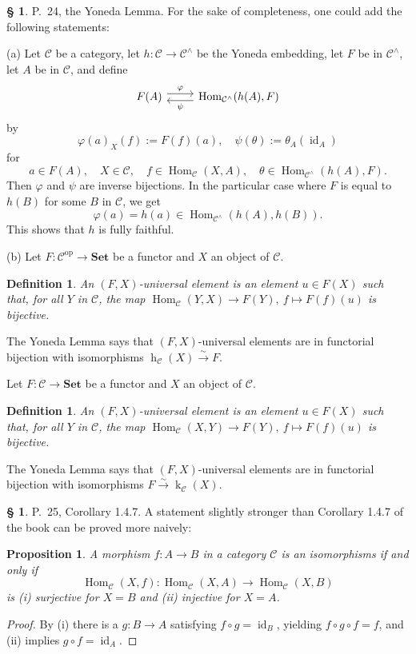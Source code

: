 \documentclass[12pt]{article}
\newtheorem{prop}[thm]{Proposition}
\newtheorem{df}[thm]{Definition}%
\theoremstyle{remark}
\theoremstyle{definition}
\newtheorem{s}[thm]{\S}
\newcommand{\C}{\mathcal C}
\newcommand{\Set}{\mathbf{Set}}
\newcommand{\xr}{\xrightarrow}
\DeclareMathOperator{\hy}{h}
\DeclareMathOperator{\ky}{k}
\DeclareMathOperator{\id}{id}
\DeclareMathOperator{\Hom}{Hom}%
\DeclareMathOperator{\op}{op}
\begin{document}
%
%
\begin{s} 
P.~24, the Yoneda Lemma. For the sake of completeness, one could add the following statements: 

\noindent(a) Let $\C$ be a category, let $h:\C\to\C^\wedge$ be the Yoneda embedding, let $F$ be in $\C^\wedge$, let $A$ be in $\C$, and define 
$$
\begin{tikzcd} 
F(A)\ar[yshift=0.7ex]{r}{\varphi}&\Hom_{\C^\wedge}(h(A),F)\ar[yshift=-0.7ex]{l}{\psi}
\end{tikzcd}
$$
by 
$$
\varphi(a)_X(f):=F(f)(a),\quad\psi(\theta):=\theta_A(\id_A)
$$
for 
$$
a\in F(A),\quad X\in\C,\quad f\in\Hom_\C(X,A),\quad\theta\in\Hom_{\C^\wedge}(h(A),F).
$$ 
Then $\varphi$ and $\psi$ are inverse bijections. In the particular case where $F$ is equal to $h(B)$ for some $B$ in $\C$, we get 
$$
\varphi(a)=h(a)\in\Hom_{\C^\wedge}(h(A),h(B)).
$$
This shows that $h$ is fully faithful.

\noindent(b) Let $F:\C^{\op}\to\Set$ be a functor and $X$ an object of $\C$.
%
\begin{df}\label{ue} 
An $(F,X)$-{\em universal element} is an element $u\in F(X)$ such that, for all $Y$ in $\C$, the map $\Hom_\C(Y,X)\to F(Y),\ f\mapsto F(f)(u)$ is bijective. 
\end{df}

The Yoneda Lemma says that $(F,X)$-universal elements are in functorial bijection with isomorphisms $\hy_\C(X)\xr\sim F$. 

Let $F:\C\to\Set$ be a functor and $X$ an object of $\C$.
%
\begin{df}\label{ue2} 
An $(F,X)$-{\em universal element} is an element $u\in F(X)$ such that, for all $Y$ in $\C$, the map $\Hom_\C(X,Y)\to F(Y),\ f\mapsto F(f)(u)$ is bijective. 
\end{df}

The Yoneda Lemma says that $(F,X)$-universal elements are in functorial bijection with isomorphisms $F\xr\sim\ky_\C(X)$.
\end{s}
%
%
\begin{s} 
P.~25, Corollary 1.4.7. A statement slightly stronger than Corollary 1.4.7 of the book can be proved more naively:
%
\begin{prop}
A morphism $f:A\to B$ in a category $\C$ is an isomorphisms if and only if 
$$
\Hom_\C(X,f):\Hom_\C(X,A)\to\Hom_\C(X,B)
$$
is (i) surjective for $X=B$ and (ii) injective for $X=A$.
\end{prop}
%
\begin{proof} By (i) there is a $g:B\to A$ satisfying $f\circ g=\id_B$, yielding $f\circ g\circ f=f$, and (ii) implies $g\circ f=\id_A$.
\end{proof}
\end{s}
\end{document}
